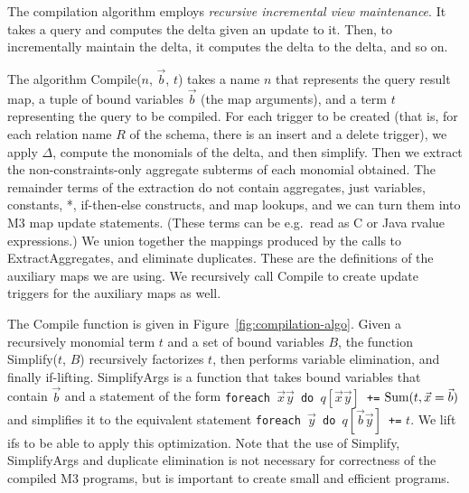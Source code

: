 The compilation algorithm employs {\em recursive incremental view
maintenance}. It takes a query and computes the delta given an update to it.
Then, to incrementally maintain the delta, it
computes the delta to the delta, and so on.

The algorithm Compile($n$, $\vec{b}$, $t$) takes a name $n$ that
represents the query result map, a tuple of bound variables $\vec{b}$ (the map
arguments), and a term $t$ representing the query to be compiled.
For each trigger to be created (that is, for each relation name $R$ of
the schema, there is an insert and a delete trigger),
we apply $\Delta$, compute the monomials of the delta, and then simplify.
Then we extract the non-constraints-only aggregate
subterms of each monomial obtained.
The remainder terms of the extraction
do not contain aggregates, just variables, constants, *,
if-then-else constructs, and map lookups, and we can turn them into
M3 map update statements. (These terms can be e.g.\ read as C or Java rvalue
expressions.)
%
We union together the mappings produced by the calls to ExtractAggregates,
and eliminate duplicates. 
These are the definitions of the auxiliary maps we are using.
We recursively call Compile to create update triggers for the
auxiliary maps as well.


The Compile function is given in Figure~\ref{fig:compilation-algo}. 
Given a recursively monomial term $t$ and a set of bound variables $B$,
the function Simplify($t$, $B$) recursively factorizes $t$, then performs
variable elimination, and finally if-lifting.
SimplifyArgs is a function that takes bound variables that contain
$\vec{b}$ and a statement of the form
{\tt foreach $\vec{x}\vec{y}$ do $q[\vec{x}\vec{y}]$ +=}
$\mbox{Sum}(t, \vec{x}=\vec{b})$
and simplifies it to the equivalent statement
{\tt foreach $\vec{y}$ do $q[\vec{b}\vec{y}]$ +=} $t$.
We lift ifs to be able to apply this optimization.
%
Note that the use of Simplify, SimplifyArgs and duplicate elimination
is not necessary for correctness of the compiled M3 programs, but is important
to create small and efficient programs.



